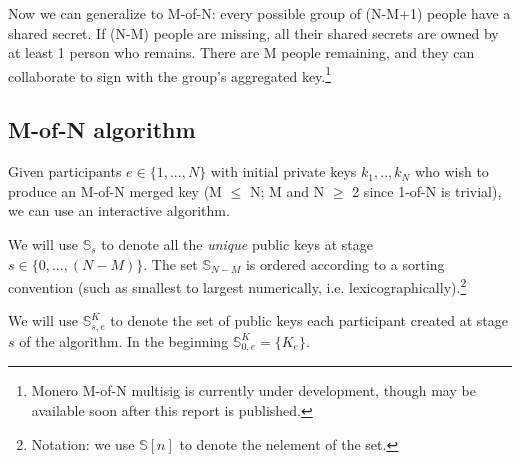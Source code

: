 Now we can generalize to M-of-N: every possible group of (N-M+1) people have a shared secret. If (N-M) people are missing, all their shared secrets are owned by at least 1 person who remains. There are M people remaining, and they can collaborate to sign with the group's aggregated key.\footnote{Monero M-of-N multisig is currently under development, though may be available soon after this report is published.}


\subsection*{M-of-N algorithm}

Given participants $e \in \{1,...,N\}$ with initial private keys $k_1,..,k_N$ who wish to produce an M-of-N merged key (M $\leq$ N; M and N $\geq$ 2 since 1-of-N is trivial), we can use an interactive algorithm. 

We will use $\mathbb{S}_s$ to denote all the {\em unique} public keys at stage $s \in \{0,...,(N-M)\}$. The set $\mathbb{S}_{N-M}$ is ordered according to a sorting convention (such as smallest to largest numerically, i.e. lexicographically).\footnote{Notation: we use $\mathbb{S}[n]$ to denote the n\nth element of the set.}

We will use $\mathbb{S}^K_{s,e}$ to denote the set of public keys each participant created at stage $s$ of the algorithm. In the beginning $\mathbb{S}^K_{0,e} = \{K_e\}$.

